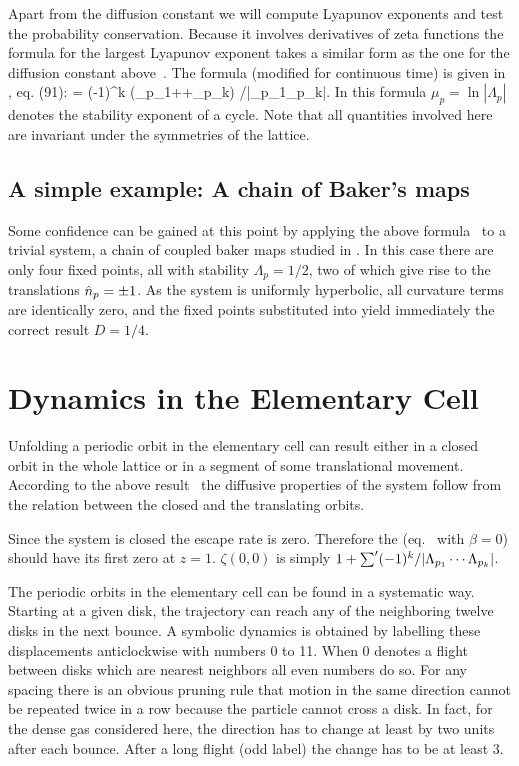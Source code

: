 Apart from the diffusion constant we will compute Lyapunov
exponents and test the
probability conservation. Because it involves derivatives of zeta functions
the formula for the largest Lyapunov exponent takes a similar form as the one
for the diffusion constant above~.
The formula (modified for continuous time)
is given in , eq. (91):
\beq \lambda=
                       {\sumprime (-1)^k (\tau_{p_1}+\cdots +\tau_{p_k})
      /|\Lambda_{p_1}\cdots \Lambda_{p_k}|}\;.
\label{TS:eqliap}
\eeq
In this formula $\mu_p=\ln|\Lambda_p|$ denotes the stability exponent of a
cycle. Note that all quantities involved here are invariant under the symmetries
of the lattice.

\subsection{A simple example: A chain of Baker's maps}
Some confidence can be gained at this point by applying the above
formula~ to a trivial system, a chain of coupled
baker maps studied in .
In this case there are only four fixed points, all with
stability $\Lambda_p=1/2$, two of
which give rise to the translations $\hat n_{p}=\pm 1$.
As the system is
uniformly hyperbolic, all curvature terms are identically zero,
and the fixed points substituted into  yield
immediately the correct result $D=1/4$.

\section{Dynamics in the Elementary Cell} \label{CELL}
Unfolding a periodic orbit in the elementary cell can
result either in a closed orbit in the whole lattice or in a segment of
some translational movement. According to the above result~
the diffusive properties of the system follow from the relation between
the closed and the translating orbits.

Since the system is closed the escape rate is zero. Therefore
the {\dzeta} (eq.~ with $\beta=0$) should have its
first zero at $z=1$. $\zeta(0,0)$
is simply $1+\mathop{{\sum}'} (-1)^k/|\Lambda_{p_1}\cdots \Lambda_{p_k}|$.

The periodic orbits in the elementary cell can be found in a systematic way.
Starting at a given disk, the trajectory can reach any of the neighboring
twelve disks in the next bounce.
A symbolic dynamics is obtained by labelling
these displacements anticlockwise with numbers 0 to 11. When 0 denotes
a flight between disks which are nearest neighbors all even numbers do so. For
any spacing there is an obvious pruning rule that motion
in the same direction cannot be repeated
twice in a row because the particle cannot cross a disk. In fact, for the
dense gas considered here,
the direction has to change at least by two units after each bounce.
After a long flight (odd label) the change has to be at least 3.

